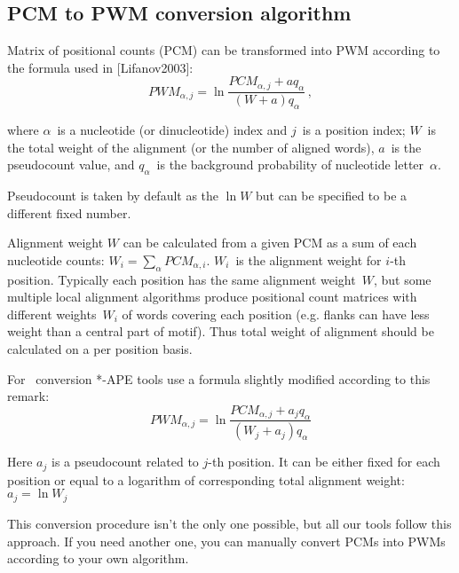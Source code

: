 \subsection{PCM to PWM conversion algorithm}
Matrix of positional counts (PCM) can be transformed into PWM according to the formula used in [Lifanov2003]:
\begin{equation}PWM_{\alpha,j} = \ln\frac{ PCM_{\alpha,j} + aq_{\alpha} }{ (W+a)q_{\alpha} }\,, \end{equation}

where $\alpha$~is a nucleotide (or dinucleotide) index and $j$~is a position index; $W$~is the total weight of the alignment (or the number of aligned words), $a$~is the
pseudocount value, and $q_{\alpha}$~is the background probability of nucleotide letter~$\alpha$.

Pseudocount is taken by default as the $\ln{W}$ but can be specified to be a different fixed number.

Alignment weight $W$ can be calculated from a given PCM as a sum of each nucleotide counts: $W_i = \sum_{\alpha}PCM_{\alpha,i}$. $W_i$~is the alignment weight for \mbox{$i$-th} position. Typically each position has the same alignment weight~$W$, but some multiple local alignment algorithms produce positional count matrices with different weights~$W_i$ of words covering each position (e.g. flanks can have less weight than a central part of motif). Thus total weight of alignment should be calculated on a per position basis.

For \PcmToPwm\ conversion *-APE tools use a formula slightly modified according to this remark:
\begin{equation}PWM_{\alpha,j} = \ln\frac{ PCM_{\alpha,j} + a_j q_{\alpha} }{ (W_j+a_j)q_{\alpha} }\end{equation}

Here $a_j$ is a pseudocount related to \mbox{$j$-th} position. It can be either fixed for each position or equal to a logarithm of corresponding total alignment weight: $a_j=\ln{W_j}$

This conversion procedure isn't the only one possible, but all our tools follow this approach. If you need another one, you can manually convert PCMs into PWMs according to your own algorithm.
